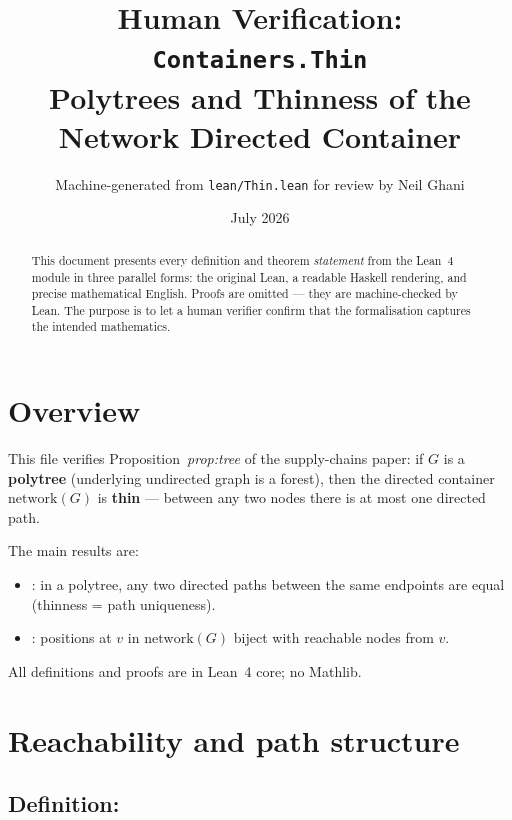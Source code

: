 \documentclass[11pt,a4paper]{article}
\title{Human Verification: \texttt{Containers.Thin}\\[4pt]
  \large Polytrees and Thinness of the Network Directed Container}
\author{Machine-generated from \texttt{lean/Thin.lean} for review by Neil Ghani}
\date{July 2026}
\begin{document}
\maketitle

\begin{abstract}
This document presents every definition and theorem \emph{statement} from the
Lean~4 module  in three parallel forms: the original
Lean, a readable Haskell rendering, and precise mathematical English.  Proofs
are omitted --- they are machine-checked by Lean.  The purpose is to let a
human verifier confirm that the formalisation captures the intended
mathematics.
\end{abstract}

\tableofcontents
\bigskip

\section{Overview}

This file verifies Proposition~\emph{prop:tree} of the supply-chains paper: if
$G$ is a \textbf{polytree} (underlying undirected graph is a forest), then the
directed container $\mathrm{network}(G)$ is \textbf{thin} --- between any two
nodes there is at most one directed path.

The main results are:
\begin{itemize}
  \item {}: in a polytree, any two directed paths
        between the same endpoints are equal (thinness = path uniqueness).
  \item {}: positions at $v$ in $\mathrm{network}(G)$
        biject with reachable nodes from $v$.
\end{itemize}

All definitions and proofs are in Lean~4 core; no Mathlib.

\section{Reachability and path structure}

\subsection{Definition: }
\end{document}
